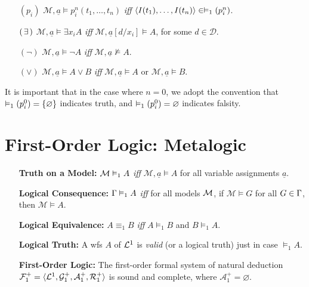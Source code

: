 \documentclass[a4paper, 11pt]{article} %
\begin{document}
\begin{enumerate}[leftmargin=1.2in,labelsep=.15in]
\begin{small}
\begin{itemize}[leftmargin=.36in]
\item[$(p_i)$] $\mathcal{M},\underline{a}\vDash  p_i^n(t_1,\dots,t_n)$ \textit{iff} $\langle I(t_1),\dots,I(t_n)\rangle\in \vDash_1(p_i^n)$.
\item[$(\hspace{1.5pt}\exists\hspace{1.5pt})$] $\mathcal{M},\underline{a}\vDash  \exists x_iA$ \textit{iff} $\mathcal{M},\underline{a}[d/x_i]\vDash A$, for some $d\in\mathcal{D}$.
\item[$(\neg)$] $\mathcal{M},\underline{a}\vDash  \neg A$ \textit{iff} $\mathcal{M},\underline{a}\nvDash A$.
\item[$(\vee)$] $\mathcal{M},\underline{a}\vDash  A\vee B$ \textit{iff} $\mathcal{M},\underline{a}\vDash  A$ or $\mathcal{M},\underline{a}\vDash  B$.
\end{itemize}
\end{small}
It is important that in the case where $n=0$, we adopt the convention that $\vDash_1(p_i^0)=\lbrace\varnothing\rbrace$ indicates truth, and $\vDash_1(p_i^0)=\varnothing$ indicates falsity.
\end{enumerate}



\section*{\sc First-Order Logic: Metalogic}%

\begin{enumerate}[leftmargin=1.2in,labelsep=.15in] %
\item[\bf Truth on a Model:] $\mathcal{M}\vDash_1 A$ \textit{iff} $\mathcal{M},\underline{a}\vDash A$ for all variable assignments $\underline{a}$.
\item[\bf Logical Consequence:] $\Gamma\vDash_1 A$ \textit{iff} for all models $\mathcal{M}$, if $\mathcal{M}\vDash G$ for all $G\in\Gamma$, then $\mathcal{M}\vDash A$.
\item[\bf Logical Equivalence:] $A\equiv_1 B$ \textit{iff} $A\vDash_1 B$ and $B\vDash_1 A$.  
\item[\bf Logical Truth:] A wfs $A$ of $\mathcal{L}^1$ is \textit{valid} (or a logical truth) just in case $\vDash_1 A$.
\item[\bf First-Order Logic:] The first-order formal system of natural deduction $\mathcal{F}_1^+=\langle\mathcal{L}^1,\mathcal{G}_1^+,\mathcal{A}_1^+,\mathcal{R}_1^+\rangle$ is sound and complete, where $\mathcal{A}_1^+=\varnothing$.
\end{enumerate}
\end{document}
